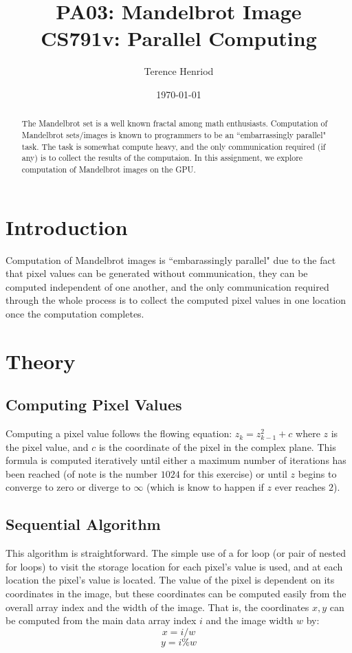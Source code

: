 \documentclass{article}
\title{PA03: Mandelbrot Image\\CS791v: Parallel Computing}
\author{Terence Henriod}
\date{\today}
\begin{document}
\clearpage
\maketitle
\thispagestyle{empty} %

\begin{abstract}
The Mandelbrot set is a well known fractal among math enthusiasts. Computation of Mandelbrot sets/images is known to programmers to be an ``embarrassingly parallel" task. The task is somewhat compute heavy, and the only communication required (if any) is to collect the results of the computaion. In this assignment, we explore computation of Mandelbrot images on the GPU. 
\end{abstract}

\newpage
\section{Introduction}
Computation of Mandelbrot images is ``embarassingly parallel" due to the fact that pixel values can be generated without communication, they can be computed independent of one another, and the only communication required through the whole process is to collect the computed pixel values in one location once the computation completes.

\section{Theory}
\subsection{Computing Pixel Values}
Computing a pixel value follows the flowing equation: $z_{k} = z_{k - 1}^{2} + c$ where $z$ is the pixel value, and $c$ is the coordinate of the pixel in the complex plane. This formula is computed iteratively until either a maximum number of iterations has been reached (of note is the number $1024$ for this exercise) or until $z$ begins to converge to zero or diverge to $\infty$ (which is know to happen if $z$ ever reaches $2$).

\subsection{Sequential Algorithm}
This algorithm is straightforward. The simple use of a for loop (or pair of nested for loops) to visit the storage location for each pixel's value is used, and at each location the pixel's value is located. The value of the pixel is dependent on its coordinates in the image, but these coordinates can be computed easily from the overall array index and the width of the image. That is, the coordinates $x, y$ can be computed from the main data array index $i$ and the image width $w$ by:
$$x = i / w$$
$$y = i \% w$$
\end{document}
